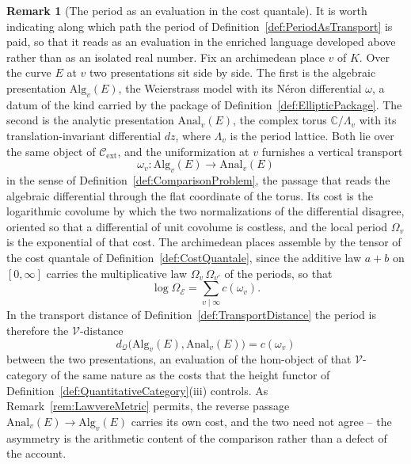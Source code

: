 \documentclass[10pt, reqno]{amsart}
\theoremstyle{plain}
\theoremstyle{definition}
\newtheorem{remark}[theorem]{Remark}
\theoremstyle{plain}
\newcommand{\C}{\mathbb{C}}
\begin{document}
\begin{remark}[The period as an evaluation in the cost quantale]\label{rem:PeriodComparisonCategory}
It is worth indicating along which path the period of Definition~\ref{def:PeriodAsTransport} is paid, so that it reads as an evaluation in the enriched language developed above rather than as an isolated real number. Fix an archimedean place $v$ of $K$. Over the curve $E$ at $v$ two presentations sit side by side. The first is the algebraic presentation $\mathrm{Alg}_v(E)$, the Weierstrass model with its N\'eron differential $\omega$, a datum of the kind carried by the package of Definition~\ref{def:EllipticPackage}. The second is the analytic presentation $\mathrm{Anal}_v(E)$, the complex torus $\C/\Lambda_v$ with its translation-invariant differential $dz$, where $\Lambda_v$ is the period lattice. Both lie over the same object of $\mathcal{C}_{\mathrm{ext}}$, and the uniformization at $v$ furnishes a vertical transport
\[
  \omega_v \colon \mathrm{Alg}_v(E) \longrightarrow \mathrm{Anal}_v(E)
\]
in the sense of Definition~\ref{def:ComparisonProblem}, the passage that reads the algebraic differential through the flat coordinate of the torus. Its cost is the logarithmic covolume by which the two normalizations of the differential disagree, oriented so that a differential of unit covolume is costless, and the local period $\Omega_v$ is the exponential of that cost. The archimedean places assemble by the tensor of the cost quantale of Definition~\ref{def:CostQuantale}, since the additive law $a+b$ on $[0,\infty]$ carries the multiplicative law $\Omega_v\,\Omega_{v'}$ of the periods, so that
\[
  \log \Omega_{\mathcal{E}} = \sum_{v \mid \infty} c(\omega_v).
\]
In the transport distance of Definition~\ref{def:TransportDistance} the period is therefore the $\mathcal{V}$-distance
\[
  d_{\mathcal{Q}}\bigl(\mathrm{Alg}_v(E),\mathrm{Anal}_v(E)\bigr) = c(\omega_v)
\]
between the two presentations, an evaluation of the hom-object of that $\mathcal{V}$-category of the same nature as the costs that the height functor of Definition~\ref{def:QuantitativeCategory}\textup{(iii)} controls. As Remark~\ref{rem:LawvereMetric} permits, the reverse passage $\mathrm{Anal}_v(E)\to\mathrm{Alg}_v(E)$ carries its own cost, and the two need not agree -- the asymmetry is the arithmetic content of the comparison rather than a defect of the account.
\end{remark}
\end{document}
